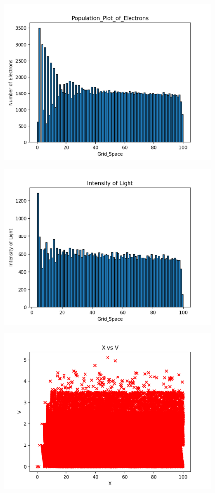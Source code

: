 \documentclass[11pt, a4paper]{article}
\begin{document}
\begin{figure}[!tbh]
    \centering
    \includegraphics[scale = 0.7]{set3_1.png}
\end{figure}
\begin{figure}[!tbh]
    \centering
    \includegraphics[scale = 0.7]{set3_2.png}
\end{figure}
\begin{figure}[!tbh]
    \centering
    \includegraphics[scale = 0.7]{set3_3.png}
\end{figure}
\end{document}
